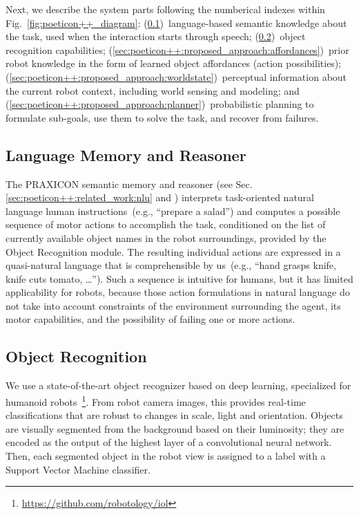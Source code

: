 Next, we describe the system parts following the numberical indexes within Fig.~\ref{fig:poeticon++_diagram}:
(\ref{sec:poeticon++:proposed_approach:language})~language-based semantic knowledge about the task, used when the interaction starts through speech;
(\ref{sec:poeticon++:proposed_approach:objrec})~object recognition capabilities;
(\ref{sec:poeticon++:proposed_approach:affordances})~prior robot knowledge in the form of learned object affordances (action possibilities);
(\ref{sec:poeticon++:proposed_approach:worldstate})~perceptual information about the current robot context, including world sensing and modeling; and (\ref{sec:poeticon++:proposed_approach:planner})~probabilistic planning
to formulate sub-goals, use them to solve the task, and recover from failures.

\subsection{Language Memory and Reasoner}
\label{sec:poeticon++:proposed_approach:language}

The PRAXICON semantic memory and reasoner (see Sec. \ref{sec:poeticon++:related_work:nlu} and \cite{pastra:2008:praxicon,mavroeidis:2016:praxicon}) interprets task-oriented natural language human instructions~(e.g., ``prepare a salad'') and computes a possible sequence of motor actions to accomplish the task, conditioned on the list of currently available object names in the robot surroundings, provided by the Object Recognition module.
The resulting individual actions are expressed in a
quasi-natural language that is comprehensible by us~(e.g., ``hand grasps knife, knife cuts tomato, \dots'').
Such a sequence is intuitive for humans, but it has limited applicability for robots, because those action formulations in natural language do not take into account constraints of the environment surrounding the agent, its motor capabilities, and the possibility of failing one or more actions.

\subsection{Object Recognition}
\label{sec:poeticon++:proposed_approach:objrec}

We use a state-of-the-art object recognizer based on deep learning, specialized for humanoid robots~\cite{pasquale:2016:iros}\footnote{\url{https://github.com/robotology/iol}}.
From robot camera images, this provides real-time classifications that are robust to changes in scale, light and orientation.
Objects are visually segmented from the background based on their luminosity; they are encoded as the output of the highest layer of a convolutional neural network.
Then, each segmented object in the robot view is assigned to a label with a Support Vector Machine classifier.

